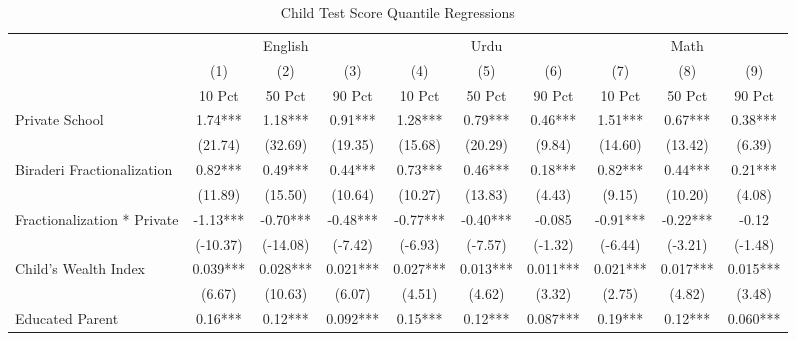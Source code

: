 \begin{sidewaystable}[htbp]\centering
\def\sym#1{\ifmmode^{#1}\else\(^{#1}\)\fi}
\caption{Child Test Score Quantile Regressions\label{kidsquants}}
\begin{tabular}{l*{9}{c}}
\toprule
                &\multicolumn{3}{c}{English}           &\multicolumn{3}{c}{Urdu}              &\multicolumn{3}{c}{Math}              \\\cmidrule(lr){2-4}\cmidrule(lr){5-7}\cmidrule(lr){8-10}
                &\multicolumn{1}{c}{(1)}&\multicolumn{1}{c}{(2)}&\multicolumn{1}{c}{(3)}&\multicolumn{1}{c}{(4)}&\multicolumn{1}{c}{(5)}&\multicolumn{1}{c}{(6)}&\multicolumn{1}{c}{(7)}&\multicolumn{1}{c}{(8)}&\multicolumn{1}{c}{(9)}\\
                &\multicolumn{1}{c}{10 Pct}&\multicolumn{1}{c}{50 Pct}&\multicolumn{1}{c}{90 Pct}&\multicolumn{1}{c}{10 Pct}&\multicolumn{1}{c}{50 Pct}&\multicolumn{1}{c}{90 Pct}&\multicolumn{1}{c}{10 Pct}&\multicolumn{1}{c}{50 Pct}&\multicolumn{1}{c}{90 Pct}\\
\midrule
Private School  &     1.74***&     1.18***&     0.91***&     1.28***&     0.79***&     0.46***&     1.51***&     0.67***&     0.38***\\
                &  (21.74)   &  (32.69)   &  (19.35)   &  (15.68)   &  (20.29)   &   (9.84)   &  (14.60)   &  (13.42)   &   (6.39)   \\
Biraderi Fractionalization&     0.82***&     0.49***&     0.44***&     0.73***&     0.46***&     0.18***&     0.82***&     0.44***&     0.21***\\
                &  (11.89)   &  (15.50)   &  (10.64)   &  (10.27)   &  (13.83)   &   (4.43)   &   (9.15)   &  (10.20)   &   (4.08)   \\
Fractionalization * Private&    -1.13***&    -0.70***&    -0.48***&    -0.77***&    -0.40***&   -0.085   &    -0.91***&    -0.22***&    -0.12   \\
                & (-10.37)   & (-14.08)   &  (-7.42)   &  (-6.93)   &  (-7.57)   &  (-1.32)   &  (-6.44)   &  (-3.21)   &  (-1.48)   \\
Child's Wealth Index&    0.039***&    0.028***&    0.021***&    0.027***&    0.013***&    0.011***&    0.021***&    0.017***&    0.015***\\
                &   (6.67)   &  (10.63)   &   (6.07)   &   (4.51)   &   (4.62)   &   (3.32)   &   (2.75)   &   (4.82)   &   (3.48)   \\
Educated Parent &     0.16***&     0.12***&    0.092***&     0.15***&     0.12***&    0.087***&     0.19***&     0.12***&    0.060***\\

\end{tabular}
\end{sidewaystable}
